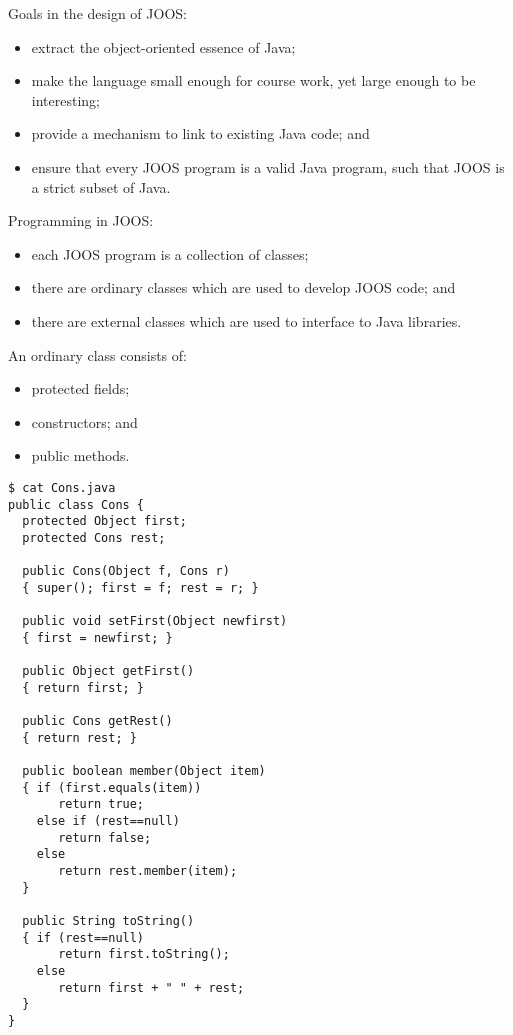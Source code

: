\begin{slide*}
Goals in the design of JOOS:
\begin{itemize}
\item extract the object-oriented essence of Java;
\item make the language small enough for course work, yet
  large enough to be interesting;
\item provide a mechanism to link to existing Java code; and
\item ensure that every JOOS program is a valid Java program, such
  that JOOS is a strict subset of Java.
\end{itemize}
\vfil
\end{slide*}

\begin{slide*}
Programming in JOOS:
\begin{itemize}
\item each JOOS program is a collection of classes;
\item there are ordinary classes which are used to
      develop JOOS code; and
\item there are external classes which are used to
      interface to Java libraries.
\end{itemize}

\vspace{0.1in}

An ordinary class consists of:
\begin{itemize}
\item protected fields;
\item constructors; and
\item public methods.
\end{itemize}
\vfil
\end{slide*}

\begin{slide*}
\begin{scriptsize}
\begin{verbatim}
$ cat Cons.java
public class Cons {
  protected Object first;
  protected Cons rest;
 
  public Cons(Object f, Cons r) 
  { super(); first = f; rest = r; }
 
  public void setFirst(Object newfirst) 
  { first = newfirst; }
 
  public Object getFirst() 
  { return first; }
 
  public Cons getRest()
  { return rest; }
 
  public boolean member(Object item)
  { if (first.equals(item))
       return true;
    else if (rest==null)
       return false;
    else
       return rest.member(item);
  }
 
  public String toString()
  { if (rest==null)
       return first.toString();
    else
       return first + " " + rest;
  }
}
\end{verbatim}
\end{scriptsize}
\vfil
\end{slide*}

